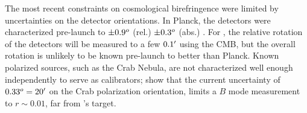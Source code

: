 \documentclass[PICOReport.tex]{subfiles}
\begin{document}
%
%

The most recent constraints on cosmological birefringence \citep{Planck2016_XLIX} were limited by uncertainties on the detector orientations.  In Planck, the detectors were characterized pre-launch to $\pm 0.9^o$ (rel.) $\pm 0.3^o$ (abs.) \citep{Rosset+2010}. For \pico, the relative rotation of the detectors will be measured to a few $0.1'$ using the CMB, but the overall rotation is unlikely to be known pre-launch to better than Planck.  Known polarized sources, such as the Crab Nebula, are not characterized well enough independently to serve as calibrators; \citet{Aumont+2018} show that the current uncertainty of $0.33^o = 20'$ on the Crab polarization orientation, limits a $B$ mode measurement to $r \sim 0.01$, far from \pico's target.

\end{document}
